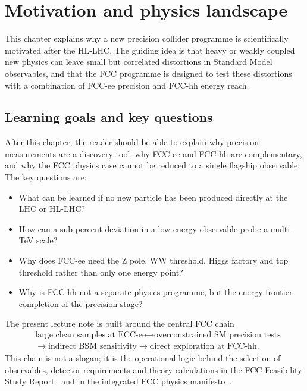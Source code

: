 \documentclass[11pt,a4paper]{article}
\numberwithin{equation}{section}
\begin{document}
\newpage
\section{Motivation and physics landscape}
\begin{guidelinebox}
This chapter explains why a new precision collider programme is scientifically motivated after the HL-LHC. The guiding idea is that heavy or weakly coupled new physics can leave small but correlated distortions in Standard Model observables, and that the FCC programme is designed to test these distortions with a combination of FCC-ee precision and FCC-hh energy reach.
\end{guidelinebox}

\subsection{Learning goals and key questions}
After this chapter, the reader should be able to explain why precision measurements are a discovery tool, why FCC-ee and FCC-hh are complementary, and why the FCC physics case cannot be reduced to a single flagship observable. The key questions are:
\begin{itemize}[leftmargin=1.6em]
\item What can be learned if no new particle has been produced directly at the LHC or HL-LHC?
\item How can a sub-percent deviation in a low-energy observable probe a multi-TeV scale?
\item Why does FCC-ee need the Z pole, WW threshold, Higgs factory and top threshold rather than only one energy point?
\item Why is FCC-hh not a separate physics programme, but the energy-frontier completion of the precision stage?
\end{itemize}

The present lecture note is built around the central FCC chain
\begin{equation}
\begin{aligned}
  &\text{large clean samples at FCC-ee}
  \longrightarrow \text{overconstrained SM precision tests} \\
  &\longrightarrow \text{indirect BSM sensitivity}
  \longrightarrow \text{direct exploration at FCC-hh} .
\end{aligned}
\end{equation}
This chain is not a slogan; it is the operational logic behind the selection of observables, detector requirements and theory calculations in the FCC Feasibility Study Report~\cite{FCCFSRVol1} and in the integrated FCC physics manifesto~\cite{FCCManifesto2025}.
\end{document}
